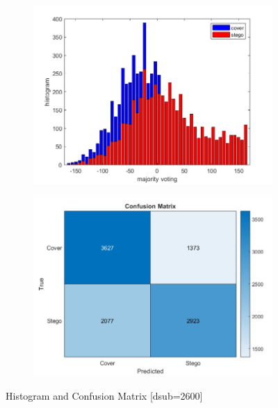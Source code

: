 \begin{figure}[H]
    \begin{subfigure}[b]{0.5\textwidth}
        \includegraphics[width=\textwidth]{img/2600/histo2600.jpg}
    \end{subfigure}
    \hfill
    \begin{subfigure}[b]{0.5\textwidth}
        \includegraphics[width=\textwidth]{img/2600/consuse2600.jpg}
    \end{subfigure}
    \caption{Histogram and Confusion Matrix [dsub=2600]}
\end{figure}
\clearpage

